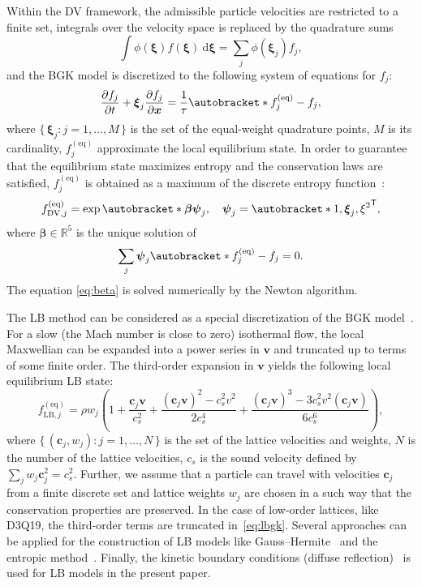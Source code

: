 \documentclass{aip-cp}
\newcommand{\dd}{\mathrm{d}}
\newcommand{\pder}[2][]{\frac{\partial#1}{\partial#2}}
\newcommand{\Set}[2]{\{\,{#1}:{#2}\,\}}
\newcommand{\transpose}[1]{#1^\mathsf{T}}
\DeclarePairedDelimiter\autobracket()       %
\newcommand{\br}[1]{\autobracket*{#1}}
\newcommand{\dxi}{\:\boldsymbol{\dd\xi}}
\newcommand{\bxi}{\boldsymbol{\xi}}
\newcommand{\bv}{\boldsymbol{v}}
\newcommand{\bc}{\boldsymbol{c}}
\newcommand{\bxia}{\bxi_j}
\newcommand{\bx}{\boldsymbol{x}}
\newcommand{\equil}[1]{#1^\mathrm{(eq)}}
\begin{document}
Within the DV framework, the admissible particle velocities are restricted to a finite set,
integrals over the velocity space is replaced by the quadrature sums
\begin{equation}\label{eq:qubatures}
    \int \phi(\bxi)f(\bxi)\dxi = \sum_j \phi(\bxi_j) f_j,
\end{equation}
and the BGK model is discretized to the following system of equations for $f_j$:
\begin{equation}\label{eq:dvm}
    \pder[f_j]{t} + \bxi_j\pder[f_j]{\bx} = \frac1\tau\br{ \equil{f}_j-f_j },
\end{equation}
where \(\Set{\bxi_j}{j=1,\dots,M}\) is the set of the equal-weight quadrature points,
$M$ is its cardinality, $\equil{f}_j$ approximate the local equilibrium state.
In order to guarantee that the equilibrium state maximizes entropy and the conservation laws are satisfied,
$\equil{f}_j$ is obtained as a maximum of the discrete entropy function~\cite{Mieussens2000}:
\begin{equation}\label{eq:equilibrium-bgk}
   \equil{f}_{\mathrm{DV},j} = \exp\br{ \boldsymbol{\beta}\boldsymbol{\psi}_{j} }, \quad
   \boldsymbol{\psi}_{j} = \transpose{\br{1,\bxia, \xi^2}},
\end{equation}
where \(\boldsymbol{\beta} \in\mathbb{R}^5\) is the unique solution of
\begin{equation}\label{eq:beta}
    \sum_j \boldsymbol{\psi}_j \br{ \equil{f}_j - f_j } = 0.
\end{equation}
The equation \eqref{eq:beta} is solved numerically by the Newton algorithm.

The LB method can be considered as a special discretization of the BGK model~\cite{Succi2018}.
For a slow (the Mach number is close to zero) isothermal flow,
the local Maxwellian can be expanded into a power series in $\bv$
and truncated up to terms of some finite order.
The third-order expansion in $\bv$ yields the following local equilibrium LB state:
\begin{equation}\label{eq:lbgk}
    \equil{f}_{\mathrm{LB},j} = \rho w_j\left(1+ \frac{\bc_j\bv}{c_s^2}+\frac{(\bc_j\bv)^2-c_s^2v^2}{2c_s^4}
    + \frac{(\bc_j\bv)^3-3c_s^2 v^2(\bc_j\bv)}{6c_s^6}\right),
\end{equation}
where \(\Set{(\bc_j,w_j)}{j=1,\dots,N}\) is the set of the lattice velocities and weights,
$N$ is the number of the lattice velocities,
$c_s$ is the sound velocity defined by $\sum_jw_j\bc^2_j=c_s^2$.
Further, we assume that a particle can travel with velocities $\bc_j$ from a finite discrete set
and lattice weights $w_j$ are chosen in a such way that the conservation properties are preserved.
In the case of low-order lattices, like D3Q19, the third-order terms are truncated in~\eqref{eq:lbgk}.
Several approaches can be applied for the construction of LB models like Gauss--Hermite~\cite{He1997, Shan1998}
and the entropic method~\cite{Chikatamarla2006}.
Finally, the kinetic boundary conditions (diffuse reflection)~\cite{Ansumali2002} is used for LB models in the present paper.
\end{document}
